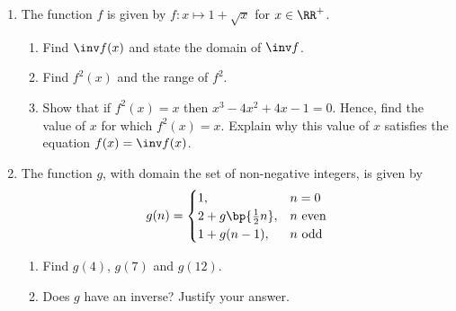 \begin{problem}
    \begin{enumerate}
        \item The function $f$ is given by $f \colon x \mapsto 1 + \sqrt{x}$ for $x \in \RR^+$. \begin{enumerate}
            \item Find $\inv f(x)$ and state the domain of $\inv f$.
            \item Find $f^2(x)$ and the range of $f^2$.
            \item Show that if $f^2(x) = x$ then $x^3 - 4x^2 + 4x - 1 = 0$. Hence, find the value of $x$ for which $f^2(x) = x$. Explain why this value of $x$ satisfies the equation $f(x) = \inv f(x)$.
        \end{enumerate}
        \item The function $g$, with domain the set of non-negative integers, is given by
        \[
            g(n) =
            \begin{cases}
                1, & n = 0\\
                2 + g\bp{\frac12 n}, & n \text{ even}\\
                1 + g(n-1), & n \text{ odd}
            \end{cases}
        \]
        \begin{enumerate}
            \item Find $g(4)$, $g(7)$ and $g(12)$.
            \item Does $g$ have an inverse? Justify your answer.
        \end{enumerate}
    \end{enumerate}
\end{problem}

